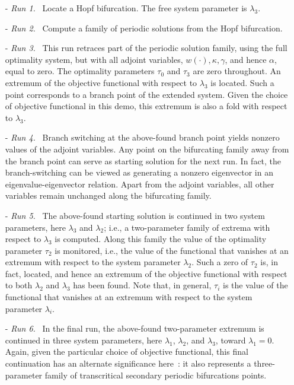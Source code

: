 \documentclass[12pt]{report}
\begin{document}
\begin{itemize}
\item[-] 
  {\it Run 1.}~ Locate a Hopf bifurcation. 
  The free system parameter is $\lambda_3$. 
\item[-]{\it Run 2.}~ 
  Compute a family of periodic solutions from the Hopf bifurcation.
\item[-]{\it Run 3.}~ 
  This run retraces part of the periodic solution family, 
  using the full optimality system,
  but with all adjoint variables, $w(\cdot), \kappa, \gamma$, 
  and hence $\alpha$, equal to zero.
  The optimality parameters $\tau_0$ and $\tau_3$ are zero throughout.
  An extremum of the objective functional with respect to $\lambda_3$
  is located.
  Such a point corresponds to a branch point of the extended system. 
  Given the choice of objective functional in this demo, 
  this extremum is also a fold with respect to $\lambda_3$.
\item[-]{\it Run 4.}~
  Branch switching at the above-found branch point yields nonzero
  values of the adjoint variables.
  Any point on the bifurcating family away from the branch point
  can serve as starting solution for the next run.
  In fact, the branch-switching can be viewed as generating
  a nonzero eigenvector in an eigenvalue-eigenvector relation.
  Apart from the adjoint variables, all other variables remain
  unchanged along the bifurcating family.
\item[-]{\it Run 5.}~ 
  The above-found starting solution is continued in two system parameters, 
  here $\lambda_3$ and $\lambda_2$; i.e., a two-parameter family 
  of extrema with respect to $\lambda_3$ is computed.
  Along this family the value of the optimality parameter $\tau_2$ 
  is monitored, i.e., the value of the functional that vanishes 
  at an extremum with respect to the system parameter $\lambda_2$.
  Such a zero of $\tau_2$ is, in fact, located, and hence an extremum 
  of the objective functional with respect to both $\lambda_2$ and 
  $\lambda_3$ has been found.
  Note that, in general, $\tau_i$ is the value of the
  functional that vanishes at an extremum with respect to the system
  parameter $\lambda_i$.
\item[-]{\it Run 6.}~ 
  In the final run, the above-found two-parameter extremum is continued
  in three system parameters, here $\lambda_1$, $\lambda_2$, 
  and $\lambda_3$, toward $\lambda_1=0$.
  Again, given the particular choice of objective functional,
  this final continuation has an alternate significance here~:
  it also represents a three-parameter family of transcritical
  secondary periodic bifurcations points.
\end{itemize}
\end{document}
